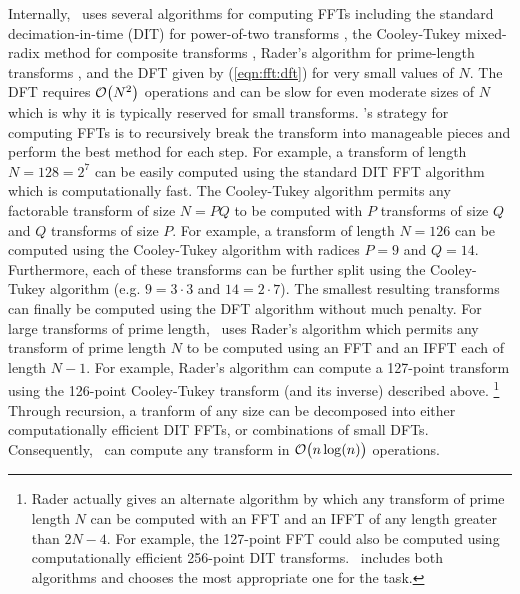 Internally, \liquid\ uses several algorithms for computing FFTs including
the standard decimation-in-time (DIT) for power-of-two transforms
    \cite[\S10-4]{Ziemer:1998},
the Cooley-Tukey mixed-radix method for composite transforms
    \cite{CooleyTukey:1965},
Rader's algorithm for prime-length transforms \cite{Rader:1968},
and the DFT given by (\ref{eqn:fft:dft}) for very small values of $N$.
The DFT requires $\mathcal{O}\bigl(N^2\bigr)$ operations
and can be slow for even moderate sizes of $N$
which is why it is typically reserved for small transforms.
\liquid's strategy for computing FFTs is to recursively break the
transform into manageable pieces and perform the best method for each
step.
For example, a transform of length $N=128=2^7$ can be easily computed
using the standard DIT FFT algorithm which is computationally fast.
The Cooley-Tukey algorithm permits any factorable transform of size
$N=PQ$ to be computed with
$P$ transforms of size $Q$ and $Q$ transforms of size $P$.
For example, a transform of length $N=126$ can be computed using the
Cooley-Tukey algorithm with radices $P=9$ and $Q=14$.
Furthermore, each of these transforms can be further split using the
Cooley-Tukey algorithm (e.g. $9=3\cdot3$ and $14=2\cdot7$).
The smallest resulting transforms can finally be computed using the DFT
algorithm without much penalty.
For large transforms of prime length, \liquid\ uses Rader's algorithm
\cite{Rader:1968}
which permits any transform of prime length $N$ to be computed using
an FFT and an IFFT each of length $N-1$.
For example, Rader's algorithm can compute a 127-point transform using
the 126-point Cooley-Tukey transform (and its inverse) described above.%
\footnote{Rader actually gives an alternate algorithm by which any
          transform of prime length $N$ can be computed with an FFT and
          an IFFT of any length greater than $2N-4$.
          For example, the 127-point FFT could also be computed using
          computationally efficient 256-point DIT transforms.
          \liquid\ includes both algorithms and chooses the most
          appropriate one for the task.}
Through recursion, a tranform of any size can be decomposed into either
computationally efficient DIT FFTs, or combinations of small DFTs.
% 
%
Consequently, \liquid\ can compute any transform in
$\mathcal{O}\bigl(n\log(n)\bigr)$ operations.

